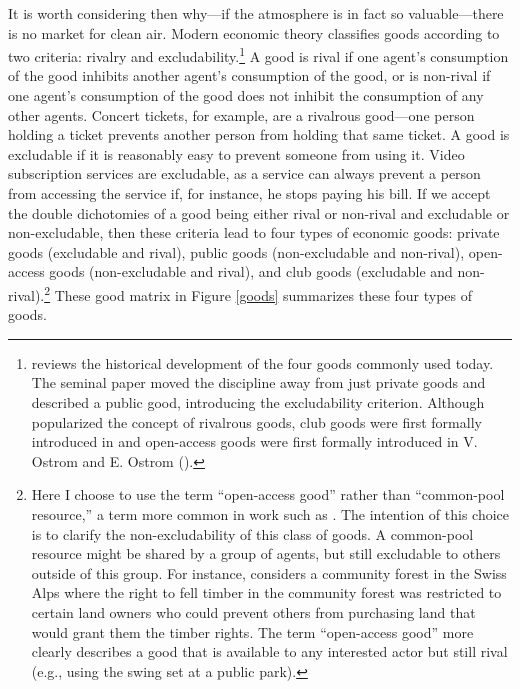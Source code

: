 It is worth considering then why---if the atmosphere is in fact so valuable---there is no market for clean air. Modern economic theory classifies goods according to two criteria: rivalry and excludability.\footnote{\cite{ostrom2010beyond} reviews the historical development of the four goods commonly used today. The seminal paper \cite{samuelson1954pure} moved the discipline away from just private goods and described a public good, introducing the excludability criterion. Although \cite{hardin1968tragedy} popularized the concept of rivalrous goods, club goods were first formally introduced in \cite{buchanan1965economic} and open-access goods were first formally introduced in V. Ostrom and E. Ostrom (\citeyear{ostrom1977public}).} A good is rival if one agent's consumption of the good inhibits another agent's consumption of the good, or is non-rival if one agent's consumption of the good does not inhibit the consumption of any other agents. Concert tickets, for example, are a rivalrous good---one person holding a ticket prevents another person from holding that same ticket. A good is excludable if it is reasonably easy to prevent someone from using it. Video subscription services are excludable, as a service can always prevent a person from accessing the service if, for instance, he stops paying his bill. If we accept the double dichotomies of a good being either rival or non-rival and excludable or non-excludable, then these criteria lead to four types of economic goods: private goods (excludable and rival), public goods (non-excludable and non-rival), open-access goods (non-excludable and rival), and club goods (excludable and non-rival).\footnote{Here I choose to use the term ``open-access good'' rather than ``common-pool resource,'' a term more common in work such as \cite{ostrom1990governing}. The intention of this choice is to clarify the non-excludability of this class of goods. A common-pool resource might be shared by a group of agents, but still excludable to others outside of this group. For instance, \cite{ostrom1990governing} considers a community forest in the Swiss Alps where the right to fell timber in the community forest was restricted to certain land owners who could prevent others from purchasing land that would grant them the timber rights. The term ``open-access good'' more clearly describes a good that is available to any interested actor but still rival (e.g., using the swing set at a public park).} These good matrix in Figure \ref{goods} summarizes these four types of goods.

